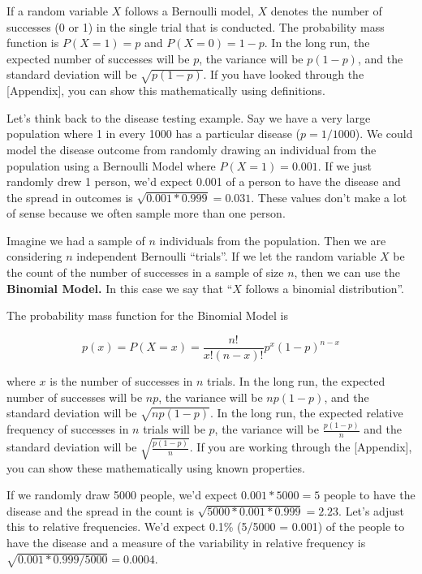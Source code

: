 \documentclass[]{book}
\begin{document}
If a random variable \(X\) follows a Bernoulli model, \(X\) denotes the number of successes (0 or 1) in the single trial that is conducted. The probability mass function is \(P(X = 1) = p\) and \(P(X = 0) = 1-p\). In the long run, the expected number of successes will be \(p\), the variance will be \(p(1-p)\), and the standard deviation will be \(\sqrt{p(1-p)}\). If you have looked through the {[}Appendix{]}, you can show this mathematically using definitions.

Let's think back to the disease testing example. Say we have a very large population where 1 in every 1000 has a particular disease (\(p = 1/1000\)). We could model the disease outcome from randomly drawing an individual from the population using a Bernoulli Model where \(P(X = 1) = 0.001\). If we just randomly drew 1 person, we'd expect 0.001 of a person to have the disease and the spread in outcomes is \(\sqrt{0.001*0.999} = 0.031\). These values don't make a lot of sense because we often sample more than one person.

Imagine we had a sample of \(n\) individuals from the population. Then we are considering \(n\) independent Bernoulli ``trials''. If we let the random variable \(X\) be the count of the number of successes in a sample of size \(n\), then we can use the \textbf{Binomial Model.} In this case we say that ``\(X\) follows a binomial distribution''.

The probability mass function for the Binomial Model is

\[p(x) = P(X = x) = \frac{n!}{x!(n-x)!}p^x(1-p)^{n-x}\]

where \(x\) is the number of successes in \(n\) trials. In the long run, the expected number of successes will be \(np\), the variance will be \(np(1-p)\), and the standard deviation will be \(\sqrt{np(1-p)}\). In the long run, the expected relative frequency of successes in \(n\) trials will be \(p\), the variance will be \(\frac{p(1-p)}{n}\) and the standard deviation will be \(\sqrt{\frac{p(1-p)}{n}}\). If you are working through the {[}Appendix{]}, you can show these mathematically using known properties.

If we randomly draw 5000 people, we'd expect \(0.001*5000 = 5\) people to have the disease and the spread in the count is \(\sqrt{5000*0.001*0.999} = 2.23\). Let's adjust this to relative frequencies. We'd expect 0.1\% (5/5000 = 0.001) of the people to have the disease and a measure of the variability in relative frequency is \(\sqrt{0.001*0.999/5000} = 0.0004\).
\end{document}
